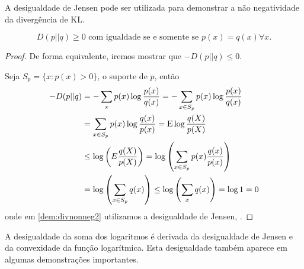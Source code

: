A desigualdade de Jensen pode ser utilizada para demonstrar a não negatividade
da divergência de KL.
\begin{lemma}
\begin{equation}
D(p||q) \geq 0 \text{ com igualdade se e somente se } p(x) = q(x) \forall x.
\end{equation}
\end{lemma}
\begin{proof}
De forma equivalente, iremos mostrar que $-D(p||q) \leq 0$.

Seja $S_p=\{x: p(x) > 0\}$, o suporte de $p$, então
\begin{subequations}\label{dem:divnonneg}
\begin{align}
-D(p||q) &= -\sum_x p(x) \log \frac{p(x)}{q(x)} = -\sum_{x \in S_p} p(x) \log \frac{p(x)}{q(x)} \label{dem:divnonneg1}\\
         &= \sum_{x \in S_p} p(x) \log \frac{q(x)}{p(x)} = \E \log \frac{q(X)}{p(X)} \label{dem:divnonneg2}\\
	 &\leq \log \left( E \frac{q(X)}{p(X)} \right) = \log \left( \sum_{x \in S_p} p(x) \frac{q(x)}{p(x)} \right) \label{dem:divnonneg3}\\
	 &= \log \left( \sum_{x \in S_p} q(x) \right) \leq \log \left( \sum_x  q(x) \right) = \log 1 = 0 \label{dem:divnonneg4}
\end{align}
\end{subequations}
onde em \ref{dem:divnonneg2} utilizamos a desigualdade de Jensen, .
\end{proof}



A desigualdade da soma dos logaritmos é derivada da desigualdade de Jensen e da convexidade da função logarítmica.
Esta desigualdade também aparece em algumas demonstrações importantes.

